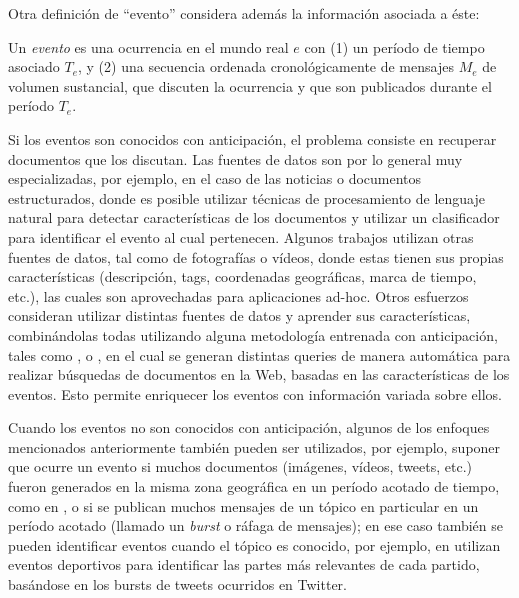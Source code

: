    Otra definición de ``evento'' considera además la información
   asociada a éste\cite{allan2002topic}:

   \begin{defn} Un \emph{evento} es una ocurrencia en el mundo real $e$ con
   (1) un período de tiempo asociado $T_e$, y (2) una secuencia
   ordenada cronológicamente de mensajes $M_e$ de volumen sustancial,
   que discuten la ocurrencia y que son publicados durante el período
   $T_e$. \end{defn}

   Si los eventos son conocidos con anticipación, el problema consiste
   en recuperar documentos que los discutan. Las fuentes de datos son
   por lo general muy especializadas, por ejemplo, en el caso de las
   noticias\cite{Diakopoulos:2012:FAS:2208276.2208409} o documentos
   estructurados, donde es posible utilizar técnicas de procesamiento
   de lenguaje natural para detectar características de los documentos
   y utilizar un clasificador para identificar el evento al cual
   pertenecen. Algunos trabajos utilizan otras fuentes de datos, tal
   como de fotografías o vídeos, donde estas tienen sus propias
   características (descripción, tags, coordenadas geográficas,
   marca de tiempo, etc.), las cuales son aprovechadas para
   aplicaciones ad-hoc\cite{Liu:2011:USM:2072609.2072613}. Otros
   esfuerzos consideran utilizar distintas fuentes de datos y aprender
   sus características, combinándolas todas utilizando alguna
   metodología entrenada con anticipación, tales como
   \cite{Becker:2010:LSM:1718487.1718524}, o
   \cite{Becker:2012:ICP:2124295.2124360}, en el cual se generan
   distintas queries de manera automática para realizar búsquedas de
   documentos en la Web, basadas en las características de los
   eventos. Esto permite  enriquecer los  eventos con información
   variada sobre ellos.

   Cuando los eventos no son conocidos con anticipación, algunos de
   los enfoques mencionados anteriormente también pueden ser
   utilizados, por ejemplo, suponer que ocurre un evento si muchos
   documentos (imágenes, vídeos, tweets, etc.) fueron generados en la
   misma zona geográfica en un período acotado de tiempo, como en
   \cite{Liu:2011:USM:2072609.2072613}, o si se publican muchos
   mensajes de un tópico en particular en un período acotado (llamado
   un \emph{burst} o ráfaga de mensajes); en ese caso también se pueden
   identificar eventos cuando el tópico es conocido, por ejemplo, en
   \cite{chakrabarti2011event} utilizan eventos deportivos para
   identificar las partes más relevantes de cada partido, basándose en
   los bursts de tweets ocurridos en Twitter.

